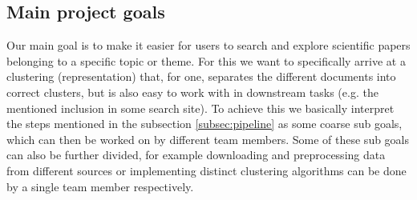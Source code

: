 \subsection{Main project goals}

Our main goal is to make it easier for users to search and explore scientific papers belonging to a specific topic or theme.
For this we want to specifically arrive at a clustering (representation) that, for one, separates the different documents into correct clusters, but is also easy to work with in downstream tasks (e.g. the mentioned inclusion in some search site).
To achieve this we basically interpret the steps mentioned in the subsection \ref{subsec:pipeline} as some coarse sub goals, which can then be worked on by different team members.
Some of these sub goals can also be further divided, for example downloading and preprocessing data from different sources or implementing distinct clustering algorithms can be done by a single team member respectively.